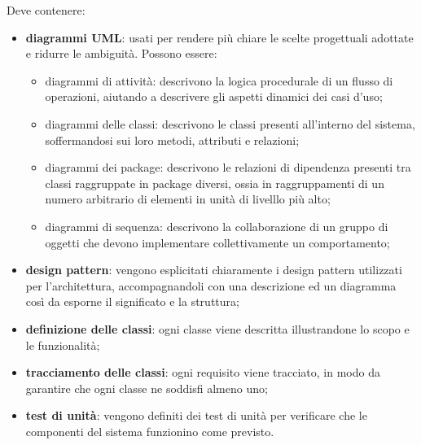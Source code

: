  Deve contenere:
  \begin{itemize}
		\item{\textbf{diagrammi UML}}: usati per rendere più chiare le scelte progettuali adottate e ridurre le ambiguità. Possono essere:
				\begin{itemize}
							\item{diagrammi di attività}: descrivono la logica procedurale di un flusso di operazioni, aiutando a descrivere gli aspetti dinamici dei casi d'uso;
				\item{diagrammi delle classi:} descrivono le classi presenti all'interno del sistema, soffermandosi sui loro metodi, attributi e relazioni;
				\item{diagrammi dei package}: descrivono le relazioni di dipendenza presenti tra classi raggruppate in package diversi, ossia in raggruppamenti di un numero arbitrario di elementi in unità di livelllo più alto;
			\item{diagrammi di sequenza}: descrivono la collaborazione di un gruppo di oggetti che devono implementare collettivamente un comportamento;
		\end{itemize}
		\item \textbf{design pattern}: vengono esplicitati chiaramente i design pattern utilizzati per l'architettura, accompagnandoli con una descrizione ed un diagramma così da esporne il significato e la struttura;
		\item \textbf{definizione delle classi}: ogni classe viene descritta illustrandone lo scopo e le funzionalità;
		\item \textbf{tracciamento delle classi}: ogni requisito viene tracciato, in modo da garantire che ogni classe ne soddisfi almeno uno;
		\item \textbf{test di unità}: vengono definiti dei test di unità per verificare che le componenti del sistema funzionino come previsto.
  \end{itemize}

